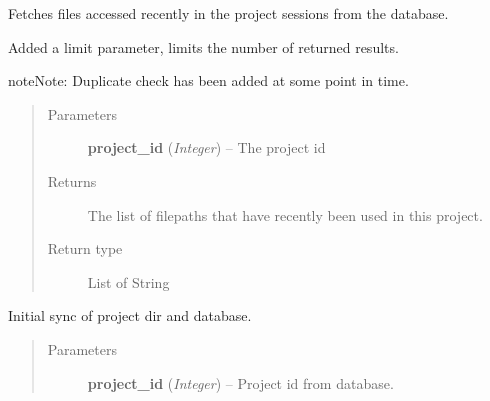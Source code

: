 \documentclass[letterpaper,10pt,english]{sphinxmanual}
\begin{document}
\begin{fulllineitems}
\label{controller:controller.project.get_recent_files}
Fetches files accessed recently in the project sessions from the database.

Added a limit parameter, limits the number of returned results.

\begin{notice}{note}{Note:}
Duplicate check has been added at some point in time.
\end{notice}
\begin{quote}\begin{description}
\item[{Parameters}] \leavevmode
\textbf{project\_id} (\emph{Integer}) -- The project id

\item[{Returns}] \leavevmode
The list of filepaths that have recently been used in this project.

\item[{Return type}] \leavevmode
List of String

\end{description}\end{quote}

\end{fulllineitems}


\begin{fulllineitems}
\label{controller:controller.project.init_sync_project_directory}
Initial sync of project dir and database.
\begin{quote}\begin{description}
\item[{Parameters}] \leavevmode
\textbf{project\_id} (\emph{Integer}) -- Project id from database.

\end{description}\end{quote}

\end{fulllineitems}

\end{document}
